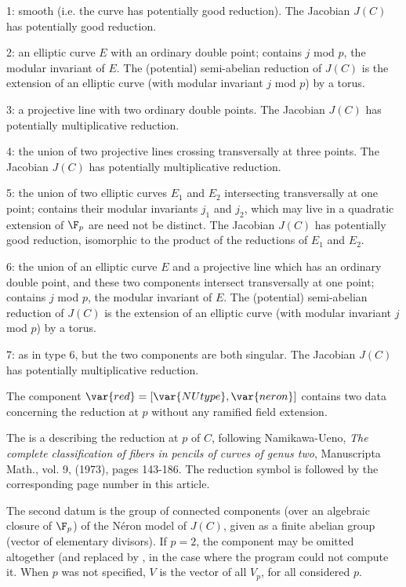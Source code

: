 \item 1: smooth (i.e. the curve has potentially good reduction). The
      Jacobian $J(C)$ has potentially good reduction.

\item 2: an elliptic curve $E$ with an ordinary double point; 
contains $j$ mod $p$, the modular invariant of $E$. The (potential)
semi-abelian reduction of $J(C)$ is the extension of an elliptic curve (with
modular invariant $j$ mod $p$) by a torus.

\item 3: a projective line with two ordinary double points. The Jacobian
$J(C)$ has potentially multiplicative reduction.

\item 4: the union of two projective lines crossing transversally at three
points. The Jacobian $J(C)$ has potentially multiplicative reduction.

\item 5: the union of two elliptic curves $E_1$ and $E_2$ intersecting
transversally at one point;  contains their modular invariants
$j_1$ and $j_2$, which may live in a quadratic extension of $\F_p$ are need
not be distinct. The Jacobian $J(C)$ has potentially good reduction,
isomorphic to the product of the reductions of $E_1$ and $E_2$.

\item 6: the union of an elliptic curve $E$ and a projective line which has
an ordinary double point, and these two components intersect transversally
at one point;  contains $j$ mod $p$, the modular invariant of $E$.
The (potential) semi-abelian reduction of $J(C)$ is the extension of an
elliptic curve (with modular invariant $j$ mod $p$) by a torus.

\item 7: as in type 6, but the two components are both singular. The
Jacobian $J(C)$ has potentially multiplicative reduction.

The component $\var{red} = [\var{NUtype}, \var{neron}]$ contains two data
concerning the reduction at $p$ without any ramified field extension.

The  is a  describing the reduction at $p$ of $C$,
following Namikawa-Ueno, \emph{The complete classification of fibers in
pencils of curves of genus two}, Manuscripta Math., vol. 9, (1973), pages
143-186. The reduction symbol is followed by the corresponding page number in
this article.

The second datum  is the group of connected components (over an
algebraic closure of $\F_p$) of the N\'eron model of $J(C)$, given as a
finite abelian group (vector of elementary divisors).
\smallskip
If $p = 2$, the  component may be omitted altogether (and
replaced by \kbd{[]}, in the case where the program could not compute it.
When $p$ was not specified, $V$ is the vector of all $V_p$, for all
considered $p$.

